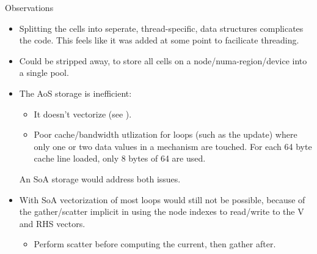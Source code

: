 \noindent
Observations
\begin{itemize}
\item
    Splitting the cells into seperate, thread-specific, data structures complicates the code. This feels like it was added at some point to facilicate threading.
\item
    Could be stripped away, to store all cells on a node/numa-region/device into a single pool.
\item
    The AoS storage is inefficient:
    \begin{itemize}
    \item
        It doesn't vectorize (see ).
    \item
        Poor cache/bandwidth utlization for loops (such as the  update) where only one or two data values in a mechanism are touched. For each 64 byte cache line loaded, only 8 bytes of 64 are used.
    \end{itemize}
    An SoA storage would address both issues.
\item
    With SoA vectorization of most loops would still not be possible, because of the gather/scatter implicit in using the node indexes to read/write to the V and RHS vectors.
    \begin{itemize}
    \item
        Perform scatter before computing the current, then gather after.
    \end{itemize}
\end{itemize}

